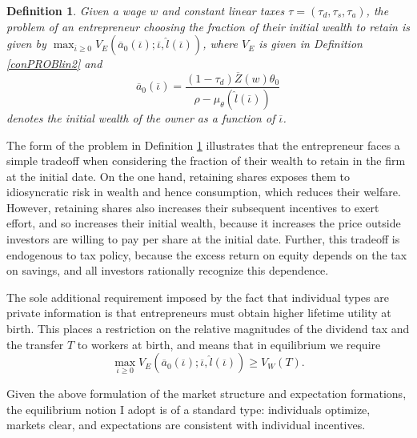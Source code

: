 \documentclass[11pt]{article}
\theoremstyle{plain}
\newtheorem{defn}{Definition}[section]
\begin{document}
\begin{defn} \label{conPROBlin3}
Given a wage $w$ and constant linear taxes $\tau = (\tau_d,\tau_s,\tau_a)$, the problem of an entrepreneur choosing the fraction of their initial wealth to retain is given by $\max_{\overline{\iota} \geq 0} V_E(\overline{a}_0(\overline{\iota}); \overline{\iota}, \hat{l}(\overline{\iota}))$, where $V_E$ is given in Definition \ref{conPROBlin2} and 
\begin{equation}
\overline{a}_0(\overline{\iota}) = \frac{(1-\tau_d)\overline{Z}(w)\theta_0}{\rho - \mu_{\theta}(\hat{l}(\overline{\iota}))}
\label{initiala}
\end{equation}
denotes the initial wealth of the owner as a function of $\overline{\iota}$.
\end{defn} %

The form of the problem in Definition \ref{conPROBlin3} illustrates that the entrepreneur faces a simple tradeoff when considering the fraction of their wealth to retain in the firm at the initial date. On the one hand, retaining shares exposes them to idiosyncratic risk in wealth and hence consumption, which reduces their welfare. However, retaining shares also increases their subsequent incentives to exert effort, and so increases their initial wealth, because it increases the price outside investors are willing to pay per share at the initial date. Further, this tradeoff is endogenous to tax policy, because the excess return on equity depends on the tax on savings, and all investors rationally recognize this dependence. 

The sole additional requirement imposed by the fact that individual types are private information is that entrepreneurs must obtain higher lifetime utility at birth. This places a restriction on the relative magnitudes of the dividend tax and the transfer $T$ to workers at birth, and means that in equilibrium we require 
\begin{equation}
\max_{\overline{\iota} \geq 0} V_E(\overline{a}_0(\overline{\iota}); \overline{\iota}, \hat{l}(\overline{\iota})) \geq V_W(T).
\label{reveal_cons}
\end{equation}

Given the above formulation of the market structure and expectation formations, the equilibrium notion I adopt is of a standard type: individuals optimize, markets clear, and expectations are consistent with individual incentives. 
\end{document}
